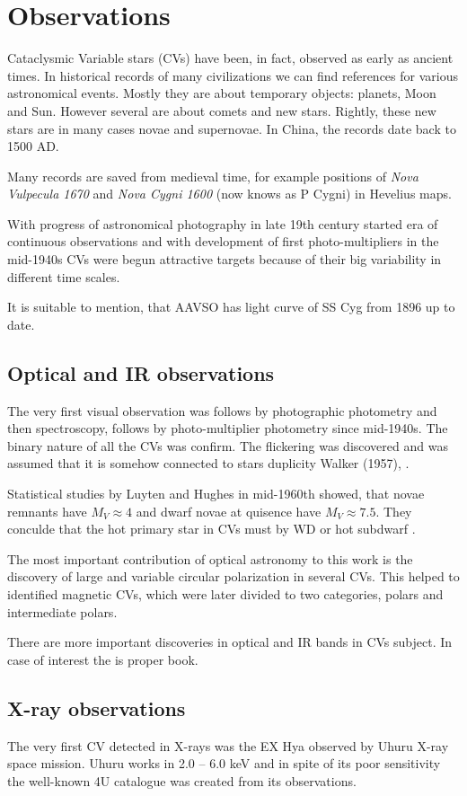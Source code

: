 \documentclass[oneside,a4paper,11pt]{report}
\begin{document}
\section{Observations}
Cataclysmic Variable stars (CVs) have been, in fact, observed as early as ancient times. In historical 
records of  many civilizations we can find references for various astronomical events. Mostly they are 
about temporary objects: planets, Moon and Sun. However several are about comets and new stars. Rightly, 
these new stars are in many cases novae and supernovae. In China, the records date back to 1500 AD. 

Many records are saved from medieval time, for example positions of \textit{Nova Vulpecula 1670} and 
\textit{Nova Cygni 1600} (now knows as P Cygni) in Hevelius maps. 

With progress of astronomical photography in late 19th century started era of continuous observations
and with  development of first photo-multipliers in the mid-1940s CVs were begun attractive 
targets because of their big variability in different time scales. 

It is suitable to mention, that AAVSO has light curve of SS Cyg from 1896 up to date. 
\subsection{Optical and IR observations}
The very first visual observation was follows by photographic photometry and then spectroscopy, 
follows by photo-multiplier photometry since mid-1940s. The binary nature of all the CVs was confirm. 
The flickering was discovered and was assumed that it is somehow connected to stars duplicity Walker (1957),
\citet{warner:1}.

Statistical studies by Luyten and Hughes in mid-1960th showed, that novae remnants have $M_V \approx 4$ and 
dwarf novae at quisence have $M_V \approx 7.5$. They conculde that the hot primary star in CVs must by WD or 
 hot subdwarf \citet{warner:1}.   

The most important contribution of optical astronomy to this work is the discovery of large and 
variable circular polarization in several CVs. This helped to identified magnetic CVs, 
which were later divided to two categories, polars and intermediate polars.

There are more important discoveries in optical and IR bands in CVs subject. In case of interest the 
 \citet{warner:1} is proper book. 
   
   
\subsection{X-ray observations}
The very first CV detected in X-rays was the EX Hya observed by Uhuru X-ray space mission. 
Uhuru  works in 2.0 – 6.0 keV and in spite of its poor sensitivity the well-known 4U catalogue
 was created \citet{1978ApJS...38..357F} from its observations.
\end{document}
